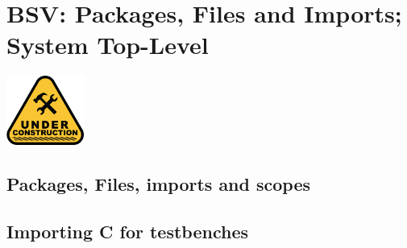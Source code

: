 

\chapter{BSV: Packages, Files and Imports; System Top-Level}


\setcounter{page}{1}
\renewcommand{\thepage}{\arabic{chapter}-\arabic{page}}

\label{ch_Packages}


\vspace{2ex}

\centerline{\includegraphics[width=1in,angle=0]{Figures/Fig_Under_Construction}}

\vspace{2ex}


\section{Packages, Files, imports and scopes}

\section{Importing C for testbenches}

